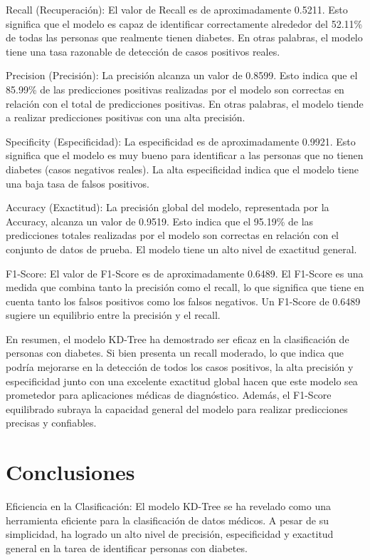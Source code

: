 \documentclass[]{article}
\begin{document}
Recall (Recuperación): El valor de Recall es de aproximadamente 0.5211. Esto significa que el modelo es capaz de identificar correctamente alrededor del 52.11\% de todas las personas que realmente tienen diabetes. En otras palabras, el modelo tiene una tasa razonable de detección de casos positivos reales.

Precision (Precisión): La precisión alcanza un valor de 0.8599. Esto indica que el 85.99\% de las predicciones positivas realizadas por el modelo son correctas en relación con el total de predicciones positivas. En otras palabras, el modelo tiende a realizar predicciones positivas con una alta precisión.

Specificity (Especificidad): La especificidad es de aproximadamente 0.9921. Esto significa que el modelo es muy bueno para identificar a las personas que no tienen diabetes (casos negativos reales). La alta especificidad indica que el modelo tiene una baja tasa de falsos positivos.

Accuracy (Exactitud): La precisión global del modelo, representada por la Accuracy, alcanza un valor de 0.9519. Esto indica que el 95.19\% de las predicciones totales realizadas por el modelo son correctas en relación con el conjunto de datos de prueba. El modelo tiene un alto nivel de exactitud general.

F1-Score: El valor de F1-Score es de aproximadamente 0.6489. El F1-Score es una medida que combina tanto la precisión como el recall, lo que significa que tiene en cuenta tanto los falsos positivos como los falsos negativos. Un F1-Score de 0.6489 sugiere un equilibrio entre la precisión y el recall.

En resumen, el modelo KD-Tree ha demostrado ser eficaz en la clasificación de personas con diabetes. Si bien presenta un recall moderado, lo que indica que podría mejorarse en la detección de todos los casos positivos, la alta precisión y especificidad junto con una excelente exactitud global hacen que este modelo sea prometedor para aplicaciones médicas de diagnóstico. Además, el F1-Score equilibrado subraya la capacidad general del modelo para realizar predicciones precisas y confiables.
\section{Conclusiones}
Eficiencia en la Clasificación: El modelo KD-Tree se ha revelado como una herramienta eficiente para la clasificación de datos médicos. A pesar de su simplicidad, ha logrado un alto nivel de precisión, especificidad y exactitud general en la tarea de identificar personas con diabetes.
\end{document}
